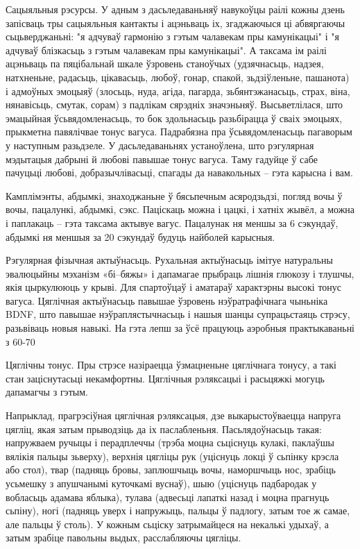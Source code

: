 Сацыяльныя рэсурсы. У адным з дасьледаваньняў навукоўцы раілі кожны дзень запісваць тры сацыяльныя кантакты і ацэньваць іх, згаджаючыся ці абвяргаючы сьцьверджаньні: "я адчуваў гармонію з гэтым чалавекам пры камунікацыі" і "я адчуваў блізкасьць з гэтым чалавекам пры камунікацыі". А таксама ім раілі ацэньваць па пяцібальнай шкале ўзровень станоўчых (удзячнасьць, надзея, натхненьне, радасьць, цікавасьць, любоў, гонар, спакой, зьдзіўленьне, пашанота) і адмоўных эмоцыяў (злосьць, нуда, агіда, пагарда, зьбянтэжанасьць, страх, віна, нянавісьць, смутак, сорам) з падлікам сярэдніх значэньняў. Высьветлілася, што эмацыйная ўсьвядомленасьць, то бок здольнасьць разьбірацца ў сваіх эмоцыях, прыкметна павялічвае тонус вагуса. Падрабязна пра ўсьвядомленасьць пагаворым у наступным разьдзеле. У дасьледаваньнях устаноўлена, што рэгулярная мэдытацыя дабрыні й любові павышае тонус вагуса. Таму гадуйце ў сабе пачуцьці любові, добразычлівасьці, спагады да навакольных – гэта карысна і вам.

Камплімэнты, абдымкі, знаходжаньне ў бясьпечным асяродзьдзі, погляд вочы ў вочы, пацалункі, абдымкі, сэкс. Паціскаць можна і цацкі, і хатніх жывёл, а можна і паплакаць – гэта таксама актывуе вагус. Пацалунак ня меншы за 6 сэкундаў, абдымкі ня меншыя за 20 сэкундаў будуць найболей карысныя.

Рэгулярная фізычная актыўнасьць. Рухальная актыўнасьць імітуе натуральны эвалюцыйны мэханізм «бі--бяжы» і дапамагае прыбраць лішнія глюкозу і тлушчы, якія цыркулююць у крыві. Для спартоўцаў і аматараў характэрны высокі тонус вагуса. Цяглічная актыўнасьць павышае ўзровень нэўратрафічнага чыньніка BDNF, што павышае нэўраплястычнасьць і нашыя шанцы супрацьстаяць стрэсу, разьвіваць новыя навыкі. На гэта лепш за ўсё працуюць аэробныя практыкаваньні з 60-70%

Цяглічны тонус. Пры стрэсе назіраецца ўзмацненьне цяглічнага тонусу, а такі стан заціснутасьці некамфортны. Цяглічныя рэляксацыі і расьцяжкі могуць дапамагчы з гэтым. 

Напрыклад, прагрэсіўная цяглічная рэляксацыя, дзе выкарыстоўваецца напруга цягліц, якая затым прыводзіць да іх паслабленьня. Пасьлядоўнасьць такая: напружваем ручыцы і перадплеччы (трэба моцна сьціснуць кулакі, паклаўшы вялікія пальцы зьверху), верхнія цягліцы рук (уціснуць локці ў сьпінку крэсла або стол), твар (падняць бровы, заплюшчыць вочы, наморшчыць нос, зрабіць усьмешку з апушчанымі куточкамі вуснаў), шыю (уціснуць падбародак у вобласьць адамава яблыка), тулава (адвесьці лапаткі назад і моцна прагнуць сьпіну), ногі (падняць уверх і напружыць, пальцы ў падлогу, затым тое ж самае, але пальцы ў столь). У кожным сьціску затрымайцеся на некалькі удыхаў, а затым зрабіце павольны выдых, расслабляючы цягліцы.

